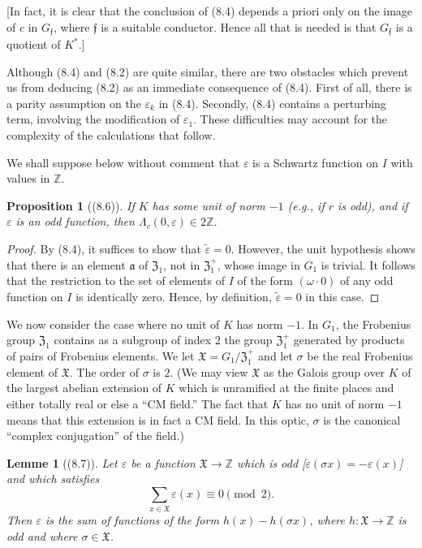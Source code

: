\documentclass[12pt,a4paper]{article}
\theoremstyle{plain}
\newtheorem{lemma}[theorem]{Lemme}
\newtheorem{proposition}[theorem]{Proposition}
\theoremstyle{definition}
\theoremstyle{remark}
\begin{document}
[In fact, it is clear that the conclusion of (8.4) depends a priori only on the image of $c$ in $G_\mathfrak{f}$, where $\mathfrak{f}$ is a suitable conductor. Hence all that is needed is that $G_\mathfrak{f}$ is a quotient of $K^*$.]

Although (8.4) and (8.2) are quite similar, there are two obstacles which prevent us from deducing (8.2) as an immediate consequence of (8.4). First of all, there is a parity assumption on the $\varepsilon_k$ in (8.4). Secondly, (8.4) contains a perturbing term, involving the modification of $\varepsilon_1$. These difficulties may account for the complexity of the calculations that follow.

We shall suppose below without comment that $\varepsilon$ is a Schwartz function on $I$ with values in $\mathbb{Z}$.

\begin{proposition}[(8.6)]\label{prop:8.6}
If $K$ has some unit of norm $-1$ (e.g., if $r$ is odd), and if $\varepsilon$ is an odd function, then $\varLambda_c(0, \varepsilon) \in 2\mathbb{Z}$.
\end{proposition}

\begin{proof}
By (8.4), it suffices to show that $\tilde{\varepsilon} = 0$. However, the unit hypothesis shows that there is an element $\mathfrak{a}$ of $\mathfrak{Z}_1$, not in $\mathfrak{Z}_1^+$, whose image in $G_1$ is trivial. It follows that the restriction to the set of elements of $I$ of the form $(\omega \cdot 0)$ of any odd function on $I$ is identically zero. Hence, by definition, $\tilde{\varepsilon} = 0$ in this case.
\end{proof}

We now consider the case where no unit of $K$ has norm $-1$. In $G_1$, the Frobenius group $\mathfrak{Z}_1$ contains as a subgroup of index $2$ the group $\mathfrak{Z}_1^+$ generated by products of pairs of Frobenius elements. We let $\mathfrak{X} = G_1/\mathfrak{Z}_1^+$ and let $\sigma$ be the real Frobenius element of $\mathfrak{X}$. The order of $\sigma$ is $2$. (We may view $\mathfrak{X}$ as the Galois group over $K$ of the largest abelian extension of $K$ which is unramified at the finite places and either totally real or else a ``CM field.'' The fact that $K$ has no unit of norm $-1$ means that this extension is in fact a CM field. In this optic, $\sigma$ is the canonical ``complex conjugation'' of the field.)

\begin{lemma}[(8.7)]\label{lem:8.7}
Let $\varepsilon$ be a function $\mathfrak{X} \to \mathbb{Z}$ which is odd [$\varepsilon(\sigma x) = -\varepsilon(x)$] and which satisfies
\[
\sum_{x \in \mathfrak{X}} \varepsilon(x) \equiv 0 \pmod{2}.
\]
Then $\varepsilon$ is the sum of functions of the form $h(x) - h(\sigma x)$, where $h: \mathfrak{X} \to \mathbb{Z}$ is odd and where $\sigma \in \mathfrak{X}$.
\end{lemma}
\end{document}
